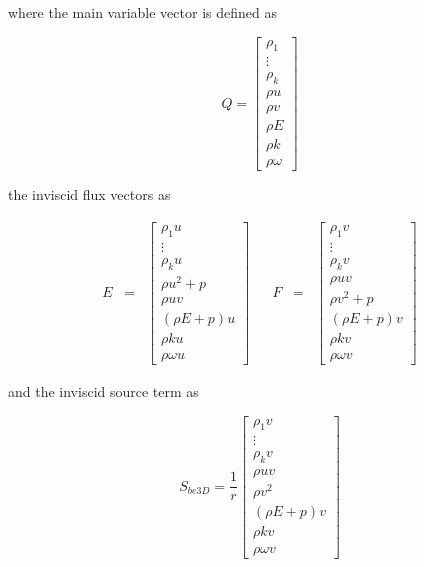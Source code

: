 	where the main variable vector is defined as

\begin{equation}
	Q = \left[ \begin{array}{c}
		\rho_1 \\
		\vdots \\
		\rho_k \\
		\rho u \\
		\rho v \\
		\rho E \\
		\rho k \\
		\rho \omega
		   \end{array}
	    \right]
\label{eqn:finalQ}
\end{equation}

	the inviscid flux vectors as

\begin{equation}
  \begin{array}{ccccccc}
	E & = & \left[ \begin{array}{c}
		\rho_1 u \\
		\vdots \\
		\rho_k u \\
		\rho u^2 + p \\
		\rho uv \\
		(\rho E + p)u \\
		\rho k u \\
		\rho \omega u
		   \end{array}
	    \right] &
	&
	F & = & \left[ \begin{array}{c}
		\rho_1 v \\
		\vdots \\
		\rho_k v \\
		\rho uv \\
		\rho v^2 + p \\
		(\rho E + p)v \\
		\rho k v \\
		\rho \omega v
		   \end{array}
	    \right]
  \end{array}
\label{eqn:finalEF}
\end{equation}

	and the inviscid source term as

\begin{equation}
	S_{be3D} = \frac{1}{r}\left[ \begin{array}{c}
		\rho_1 v \\
		\vdots \\
		\rho_k v \\
		\rho uv \\
		\rho v^2 \\
		(\rho E + p)v \\
		\rho k v \\
		\rho \omega v
		   \end{array}
	    \right]
\label{eqn:finalH}
\end{equation}


